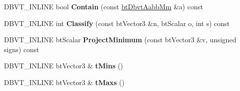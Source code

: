 \begin{DoxyCompactItemize}
\item 
\hypertarget{structbt_dbvt_aabb_mm_ad243c622155b184899be2b5d26676205}{D\+B\+V\+T\+\_\+\+I\+N\+L\+I\+N\+E bool {\bfseries Contain} (const \hyperlink{structbt_dbvt_aabb_mm}{bt\+Dbvt\+Aabb\+Mm} \&a) const }\label{structbt_dbvt_aabb_mm_ad243c622155b184899be2b5d26676205}

\item 
\hypertarget{structbt_dbvt_aabb_mm_a188e9538a55f95aa7c3fecaac31d4269}{D\+B\+V\+T\+\_\+\+I\+N\+L\+I\+N\+E int {\bfseries Classify} (const bt\+Vector3 \&n, bt\+Scalar o, int s) const }\label{structbt_dbvt_aabb_mm_a188e9538a55f95aa7c3fecaac31d4269}

\item 
\hypertarget{structbt_dbvt_aabb_mm_af2e88ca5b3b81a76585ca1282cd04ae4}{D\+B\+V\+T\+\_\+\+I\+N\+L\+I\+N\+E bt\+Scalar {\bfseries Project\+Minimum} (const bt\+Vector3 \&v, unsigned signs) const }\label{structbt_dbvt_aabb_mm_af2e88ca5b3b81a76585ca1282cd04ae4}

\item 
\hypertarget{structbt_dbvt_aabb_mm_ad920901ffab4ca5cad8692e71aca0399}{D\+B\+V\+T\+\_\+\+I\+N\+L\+I\+N\+E bt\+Vector3 \& {\bfseries t\+Mins} ()}\label{structbt_dbvt_aabb_mm_ad920901ffab4ca5cad8692e71aca0399}

\item 
\hypertarget{structbt_dbvt_aabb_mm_a96df1c148eecb1df8be67d9b7271f2da}{D\+B\+V\+T\+\_\+\+I\+N\+L\+I\+N\+E bt\+Vector3 \& {\bfseries t\+Maxs} ()}\label{structbt_dbvt_aabb_mm_a96df1c148eecb1df8be67d9b7271f2da}

\end{DoxyCompactItemize}
